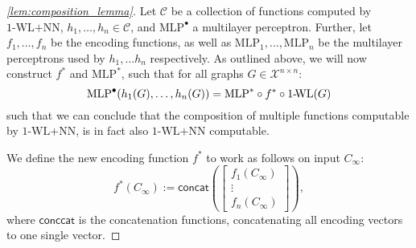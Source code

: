 \documentclass[11pt, dvipsnames, DIV=12]{scrreprt}
\theoremstyle{definition}
\newcommand{\cC}{\mathcal{C}}
\newcommand{\wlnn}{\text{1-WL+NN}}
\newcommand{\xnn}{\mathcal{X}^{n \times n}}
\newcommand{\wl}{\text{1-\!WL}}
\newcommand{\mlp}{\text{MLP}}
\begin{document}
\begin{proof}[\cref{lem:composition_lemma}]
    Let $\cC$ be a collection of functions computed by $\wlnn$, $h_1, \dots ,h_n \in \cC$, and $\mlp^\bullet$ a multilayer perceptron. Further, let $f_{1}, \ldots, f_{n}$ be the encoding functions, as well as $\text{MLP}_1, \ldots, \text{MLP}_n$ be the multilayer perceptrons used by $h_1, \dots h_n$ respectively. As outlined above, we will now construct $f^*$ and $\mlp^*$, such that for all graphs $G \in \xnn$:
    \begin{equation*}
        \mlp^\bullet(h_1(G), \dots ,h_n(G)) = \mlp^* \circ f^* \circ \wl(G)
    \end{equation*}
    such that we can conclude that the composition of multiple functions computable by $\wlnn$, is in fact also $\wlnn$ computable. 

    We define the new encoding function $f^*$ to work as follows on input $C_\infty$:
    \begin{equation*}
        f^*(C_\infty) := \textsf{concat}(
            \begin{bmatrix}
                f_1(C_\infty)\\
                \vdots\\
                f_n(C_\infty)
            \end{bmatrix}),
    \end{equation*}
    where $\textsf{conccat}$ is the concatenation functions, concatenating all encoding vectors to one single vector.


\end{proof}
\end{document}
